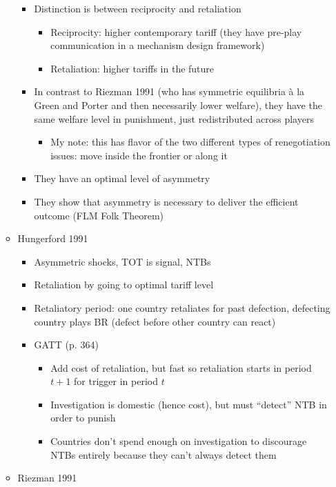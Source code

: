 \documentclass[12pt]{article}
\begin{document}
\begin{itemize}
\begin{itemize}
\begin{itemize}
					\item Distinction is between reciprocity and retaliation
						\begin{itemize}
							\item Reciprocity: higher contemporary tariff (they have pre-play communication in a mechanism design framework)
							\item Retaliation: higher tariffs in the future
						\end{itemize}
					\item In contrast to Riezman 1991 (who has symmetric equilibria \`{a} la Green and Porter and then necessarily lower welfare), they have the same welfare level in punishment, just redistributed across players
						\begin{itemize}
							\item My note: this has flavor of the two different types of renegotiation issues: move inside the frontier or along it
						\end{itemize}
					\item They have an optimal level of asymmetry
					\item They show that asymmetry is necessary to deliver the efficient outcome (FLM Folk Theorem)
				\end{itemize}
			\item Hungerford 1991
				\begin{itemize}
					\item Asymmetric shocks, TOT is signal, NTBs
					\item Retaliation by going to optimal tariff level
					\item Retaliatory period: one country retaliates for past defection, defecting country plays BR (defect before other country can react)
					\item GATT (p. 364)
						\begin{itemize}
							\item Add cost of retaliation, but fast so retaliation starts in period $t+1$ for trigger in period $t$
							\item Investigation is domestic (hence cost), but must ``detect'' NTB in order to punish
							\item Countries don't spend enough on investigation to discourage NTBs entirely because they can't always detect them
						\end{itemize}
				\end{itemize}
			\item Riezman 1991
				\begin{itemize}

\end{itemize}
\end{itemize}
\end{itemize}
\end{document}
